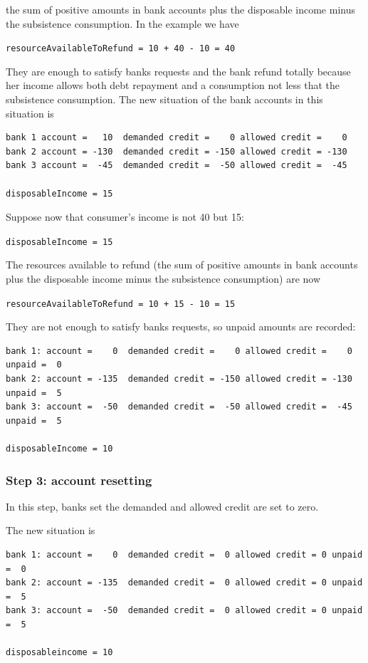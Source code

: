 \documentclass{article}
\begin{document}
the sum of positive amounts in bank accounts plus the disposable income minus the subsistence consumption. In the example we have

\verb/resourceAvailableToRefund = 10 + 40 - 10 = 40/

They are enough to satisfy banks requests and 
the bank refund totally because her income allows both debt repayment and a consumption not less that the subsistence consumption. 
The new situation of the bank accounts in this situation is

\begin{verbatim}
bank 1 account =   10  demanded credit =    0 allowed credit =    0
bank 2 account = -130  demanded credit = -150 allowed credit = -130 
bank 3 account =  -45  demanded credit =  -50 allowed credit =  -45

disposableIncome = 15
\end{verbatim}



Suppose now that consumer's income is not 40 but 15:

\verb+disposableIncome = 15+

The resources available to refund (the sum of positive amounts in bank accounts plus the disposable income minus the subsistence consumption) are now

\verb/resourceAvailableToRefund = 10 + 15 - 10 = 15/

They are not enough to satisfy banks requests, so unpaid amounts are recorded:

\begin{verbatim}
bank 1: account =    0  demanded credit =    0 allowed credit =    0 unpaid =  0
bank 2: account = -135  demanded credit = -150 allowed credit = -130 unpaid =  5
bank 3: account =  -50  demanded credit =  -50 allowed credit =  -45 unpaid =  5

disposableIncome = 10
\end{verbatim}

\subsubsection*{Step 3: account resetting}
In this step, banks set the demanded and allowed credit are set to zero.

The new situation is

\begin{verbatim}
bank 1: account =    0  demanded credit =  0 allowed credit = 0 unpaid =  0
bank 2: account = -135  demanded credit =  0 allowed credit = 0 unpaid =  5
bank 3: account =  -50  demanded credit =  0 allowed credit = 0 unpaid =  5

disposableincome = 10
\end{verbatim}
\end{document}
